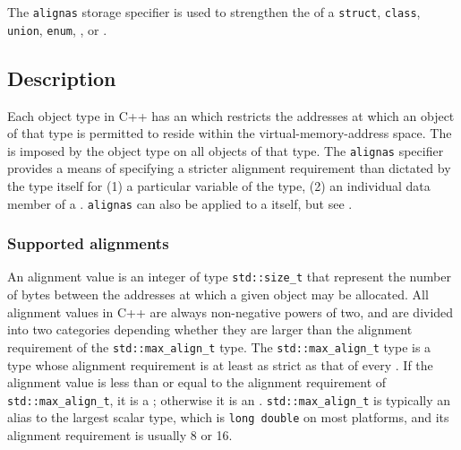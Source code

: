 

\setcounter{table}{0}
\setcounter{footnote}{0}
\setcounter{lstlisting}{0}

The \lstinline!alignas! storage specifier is used to strengthen 
the  of a \lstinline!struct!, \lstinline!class!, \lstinline!union!, \lstinline!enum!, , or .

\subsection[Description]{Description}\label{description-alignas}

Each object type in C++ has an  which restricts the addresses at which an object of that type is permitted to reside within the virtual-memory-address space. The  is imposed by the object type on all objects of that type. The \lstinline!alignas! specifier provides a means of specifying a stricter alignment requirement than dictated by the type itself for (1) a particular variable of the type, (2) an individual data member of a . \lstinline!alignas! can also be applied to a  itself, but see .

\subsubsection[Supported alignments]{Supported alignments}\label{description-supported-alignments}

An alignment value is an integer of type \lstinline!std::size_t! that represent the number of bytes between the addresses at which a given object may be allocated.  All alignment values in C++ are always non-negative powers of two, and are divided into two categories depending whether they are larger than the alignment requirement of the \lstinline!std::max_align_t! type.  The \lstinline!std::max_align_t! type is a type whose alignment requirement is at least as strict as that of every .  If the alignment value is less than or equal to the alignment requirement of \lstinline!std::max_align_t!, it is a ; otherwise it is an .  \lstinline!std::max_align_t! is typically an alias to the largest scalar type, which is \lstinline!long double! on most platforms, and its alignment requirement is usually 8 or 16.

